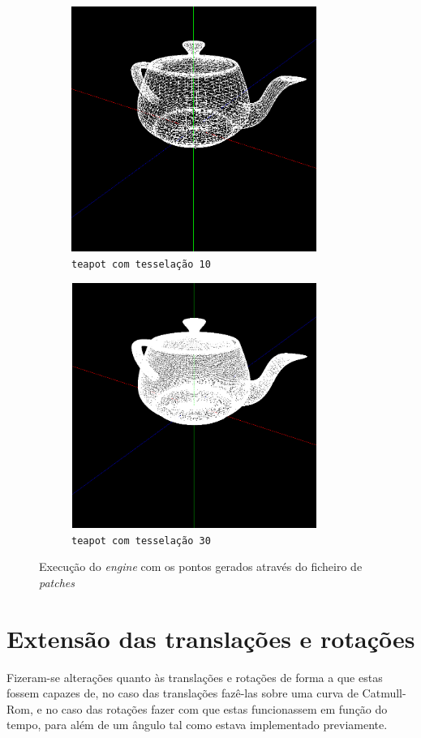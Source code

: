 \documentclass[11pt,a4paper]{report}
\begin{document}
\vspace{1cm}
\begin{figure}[H]
\centering
\begin{subfigure}{0.5\textwidth}
  \centering
  \includegraphics[width = 8cm,height = 8cm]{teapot_tesselation_10.png}
  \caption{\texttt{teapot com tesselação 10}}
  \label{fig:teapot com tesselação 10}
\end{subfigure}%
\begin{subfigure}{0.5\textwidth}
  \centering
  \includegraphics[width = 8cm,height = 8cm]{teapot_tesselation_30.png}
  \caption{\texttt{teapot com tesselação 30}}
  \label{fig:teapot com tesselação 30}
\end{subfigure}
\label{fig:teapots}
\caption{Execução do \textit{engine} com os pontos gerados através do ficheiro de \textit{patches}}
\end{figure}


\newpage
\section{Extensão das translações e rotações}
Fizeram-se alterações quanto às translações e rotações de forma a que estas fossem capazes de, no caso das translações fazê-las sobre uma curva de Catmull-Rom, e no caso das rotações fazer com que estas funcionassem em função do tempo, para além de um ângulo tal como estava implementado previamente.
\end{document}
